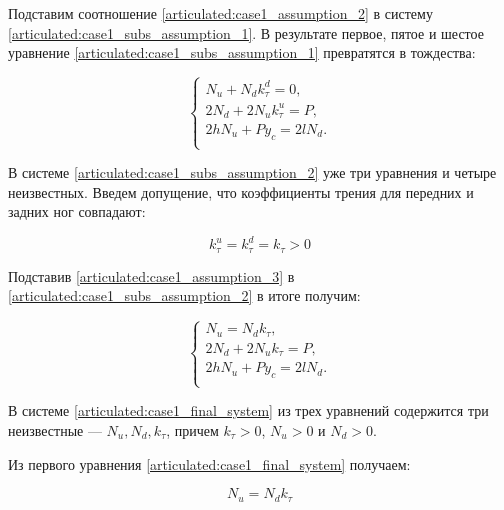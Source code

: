 Подставим соотношение \ref{articulated:case1_assumption_2} в систему \ref{articulated:case1_subs_assumption_1}. В результате первое, пятое и шестое уравнение \ref{articulated:case1_subs_assumption_1} превратятся в тождества:

\begin{equation}
\label{articulated:case1_subs_assumption_2}
  \left\{
  \begin{alignedat}{3}
    N_u + N_dk_\tau^d = 0, \\
    2N_d + 2N_uk_\tau^u = P, \\
    2hN_u + Py_c = 2lN_d.\\
  \end{alignedat}
  \right.
\end{equation}

В системе \ref{articulated:case1_subs_assumption_2} уже три уравнения и четыре неизвестных. Введем допущение, что коэффициенты трения для передних и задних ног совпадают: 

\begin{equation}
  \label{articulated:case1_assumption_3}
  k_\tau^u = k_\tau^d = k_\tau > 0
\end{equation}


Подставив \ref{articulated:case1_assumption_3} в \ref{articulated:case1_subs_assumption_2} в итоге получим:

\begin{equation}
  \label{articulated:case1_final_system}
  \left\{
  \begin{alignedat}{2}
    N_u = N_dk_\tau,\\
    2N_d + 2N_uk_\tau = P,\\
    2hN_u + Py_c = 2lN_d.\\
      \end{alignedat}
  \right.
\end{equation}

В системе \ref{articulated:case1_final_system} из трех уравнений содержится три неизвестные --- $N_u, N_d, k_\tau$, причем $k_\tau > 0$, $N_u > 0$ и $N_d > 0$.

Из первого уравнения \ref{articulated:case1_final_system} получаем:

\begin{equation}
\label{articulated:case1_Nu}
  N_u = N_dk_\tau
\end{equation}

